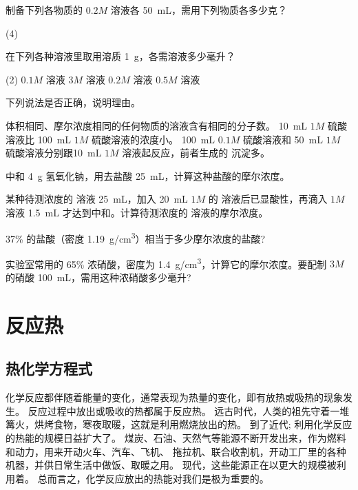 \begin{Practice}[习题]
  \begin{question}
    \item 制备下列各物质的 $0.2M$ 溶液各 \qty{50}{mL}，需用下列物质各多少克？
    \begin{tasks}(4)
      \task {}
      \task {}
      \task {}
      \task {}
    \end{tasks}
    \item 在下列各种溶液里取用溶质 \qty{1}{g}，各需溶液多少毫升？
    \begin{tasks}(2)
      \task $0.1M$  溶液
      \task $3M$    溶液
      \task $0.2M$  溶液
      \task $0.5M$  溶液
    \end{tasks}
    \item 下列说法是否正确，说明理由。
    \begin{tasks}
      \task 体积相同、摩尔浓度相同的任何物质的溶液含有相同的分子数。
      \task \qty{10}{mL} $1M$ 硫酸溶液比 \qty{100}{mL} $1M$ 硫酸溶液的浓度小。
      \task \qty{100}{mL} $0.1M$ 硫酸溶液和 \qty{50}{mL} $1M$ 硫酸溶液分别跟\qty{10}{mL} $1M$  溶液起反应，前者生成的  沉淀多。 
    \end{tasks}
    \item 中和 \qty{4}{g} 氢氧化钠，用去盐酸 \qty{25}{mL}，计算这种盐酸的摩尔浓度。
    \item 某种待测浓度的  溶液 \qty{25}{mL}，加入 \qty{20}{mL} $1M$ 的  溶液后已显酸性，再滴入 $1M$  溶液 \qty{1.5}{mL} 才达到中和。计算待测浓度的  溶液的摩尔浓度。
    \item 37\% 的盐酸（密度 \qty{1.19}{g/cm^3}）相当于多少摩尔浓度的盐酸?
    \item 实验室常用的 65\% 浓硝酸，密度为 \qty{1.4}{g/cm^3}，计算它的摩尔浓度。要配制 $3M$ 的硝酸 \qty{100}{mL}，需用这种浓硝酸多少毫升?
  \end{question}
\end{Practice}

\section{反应热}
\subsection{热化学方程式}
化学反应都伴随着能量的变化，通常表现为热量的变化，即有放热或吸热的现象发生。
反应过程中放出或吸收的热都属于反应热。
远古时代，人类的祖先守着一堆篝火，烘烤食物，寒夜取暖，这就是利用燃烧放出的热。
到了近代; 利用化学反应的热能的规模日益扩大了。
煤炭、石油、天然气等能源不断开发出来，作为燃料和动力，用来开动火车、汽车、飞机、 拖拉机、联合收割机，开动工厂里的各种机器，并供日常生活中做饭、取暖之用。
现代，这些能源正在以更大的规模被利用着。
总而言之，化学反应放出的热能对我们是极为重要的。


